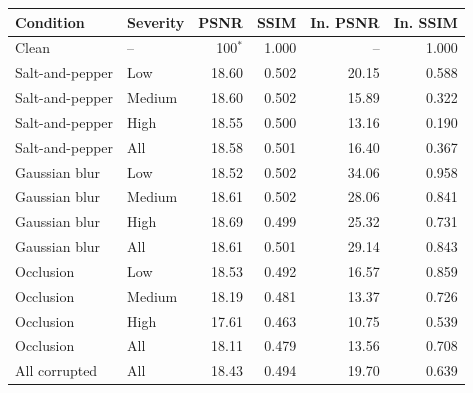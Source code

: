 \begin{tabular}{llrrrr}
\toprule
Condition & Severity & PSNR & SSIM & In. PSNR & In. SSIM \\
\midrule
Clean & -- & 100$^{*}$ & 1.000 & -- & 1.000 \\
\midrule
Salt-and-pepper & Low & 18.60 & 0.502 & 20.15 & 0.588 \\
Salt-and-pepper & Medium & 18.60 & 0.502 & 15.89 & 0.322 \\
Salt-and-pepper & High & 18.55 & 0.500 & 13.16 & 0.190 \\
Salt-and-pepper & All & 18.58 & 0.501 & 16.40 & 0.367 \\
\midrule
Gaussian blur & Low & 18.52 & 0.502 & 34.06 & 0.958 \\
Gaussian blur & Medium & 18.61 & 0.502 & 28.06 & 0.841 \\
Gaussian blur & High & 18.69 & 0.499 & 25.32 & 0.731 \\
Gaussian blur & All & 18.61 & 0.501 & 29.14 & 0.843 \\
\midrule
Occlusion & Low & 18.53 & 0.492 & 16.57 & 0.859 \\
Occlusion & Medium & 18.19 & 0.481 & 13.37 & 0.726 \\
Occlusion & High & 17.61 & 0.463 & 10.75 & 0.539 \\
Occlusion & All & 18.11 & 0.479 & 13.56 & 0.708 \\
\midrule
All corrupted & All & 18.43 & 0.494 & 19.70 & 0.639 \\
\bottomrule
\end{tabular}
